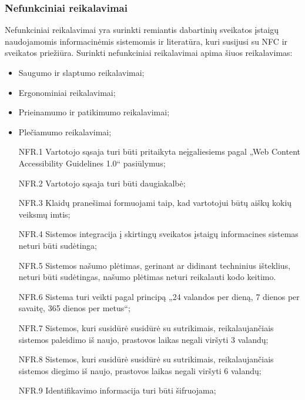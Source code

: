 \subsubsection{Nefunkciniai reikalavimai}
Nefunkciniai reikalavimai yra surinkti remiantis dabartinių sveikatos įstaigų naudojamomis informacinėmis sistemomis ir literatūra, kuri susijusi su NFC ir sveikatos priežiūra. Surinkti nefunkciniai reikalavimai apima šiuos reikalavimas:
\begin{itemize}
    \item Saugumo ir slaptumo reikalavimai;
    \item Ergonominiai reikalavimai;
    \item Prieinamumo ir patikimumo reikalavimai;
    \item Plečiamumo reikalavimai;
\end{itemize}

\begin{itemize}
    \item [NFR.1] Vartotojo sąsaja turi būti pritaikyta neįgaliesiems pagal „Web Content Accessibility Guidelines 1.0“ pasiūlymus;
    \item [NFR.2] Vartotojo sąsaja turi būti daugiakalbė;
    \item [NFR.3] Klaidų pranešimai formuojami taip, kad vartotojui būtų aiškų kokių veiksmų imtis;
    \item [NFR.4] Sistemos integracija į skirtingų sveikatos įstaigų informacines sistemas neturi būti sudėtinga;
    \item [NFR.5] Sistemos našumo plėtimas, gerinant ar didinant techninius išteklius, neturi būti sudėtingas, našumo plėtimas neturi reikalauti kodo keitimo.
    \item [NFR.6] Sistema turi veikti pagal principą „24 valandos per dieną, 7 dienos per savaitę, 365 dienos per metus“;
    \item [NFR.7] Sistemos, kuri susidūrė susidūrė su sutrikimais, reikalaujančiais sistemos paleidimo iš naujo, prastovos laikas negali viršyti 3 valandų;
    \item [NFR.8] Sistemos, kuri susidūrė susidūrė su sutrikimais, reikalaujančiais sistemos diegimo iš naujo, prastovos laikas negali viršyti 6 valandų;
    \item [NFR.9] Identifikavimo informacija turi būti šifruojama;
\end{itemize}